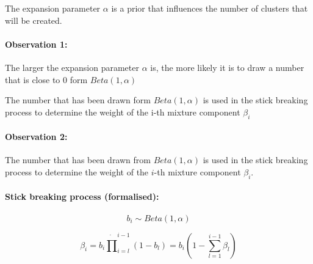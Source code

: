 The expansion parameter $\alpha$ is a prior that influences the number of clusters that will be created.

\paragraph{Observation 1:}
The larger the expansion parameter $\alpha$ is, the more likely it is to draw a number that is close to $0$ form $Beta(1,\alpha)$

The number that has been drawn form $Beta(1,\alpha)$ is used in the stick breaking process to determine the weight of the i-th mixture component $\beta_i$

\paragraph{Observation 2:}
The number that has been drawn from \(Beta(1,\alpha)\) is used in the stick breaking process to determine the weight of the \(i\)-th mixture component \(\beta_i\).

\paragraph{Stick breaking process (formalised):}

\begin{equation*}
	b_i \sim Beta(1,\alpha)
\end{equation*}

\begin{equation*}
	\beta_i = b_i \dot \prod_{i=l}^{i-1}(1-b_l) = b_i (1 - \sum_{l=1}^{i-1} \beta_l)
\end{equation*}

